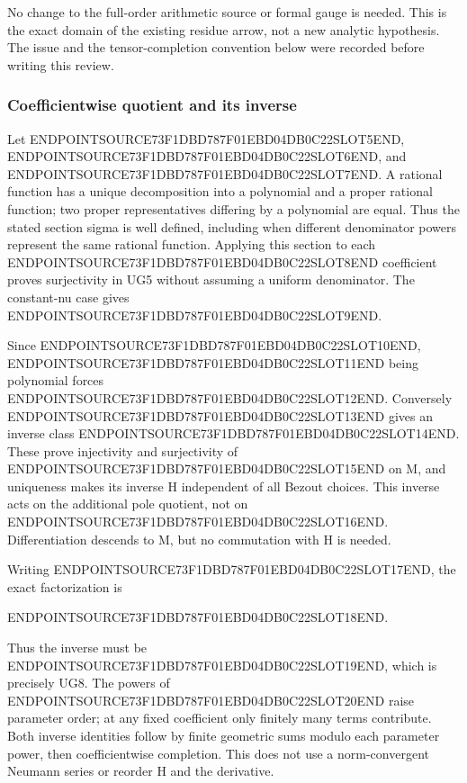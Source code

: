 No change to the full-order arithmetic source or formal gauge is needed. This is the exact domain of the existing residue arrow, not a new analytic hypothesis. The issue and the tensor-completion convention below were recorded before writing this review.

\subsubsection{Coefficientwise quotient and its inverse}\label{endpoint-f1_unit_gauge_review--coefficientwise-quotient-and-its-inverse}

Let ENDPOINTSOURCE73F1DBD787F01EBD04DB0C22SLOT5END, ENDPOINTSOURCE73F1DBD787F01EBD04DB0C22SLOT6END, and ENDPOINTSOURCE73F1DBD787F01EBD04DB0C22SLOT7END. A rational function has a unique decomposition into a polynomial and a proper rational function; two proper representatives differing by a polynomial are equal. Thus the stated section sigma is well defined, including when different denominator powers represent the same rational function. Applying this section to each ENDPOINTSOURCE73F1DBD787F01EBD04DB0C22SLOT8END coefficient proves surjectivity in UG5 without assuming a uniform denominator. The constant-nu case gives ENDPOINTSOURCE73F1DBD787F01EBD04DB0C22SLOT9END.

Since ENDPOINTSOURCE73F1DBD787F01EBD04DB0C22SLOT10END, ENDPOINTSOURCE73F1DBD787F01EBD04DB0C22SLOT11END being polynomial forces ENDPOINTSOURCE73F1DBD787F01EBD04DB0C22SLOT12END. Conversely ENDPOINTSOURCE73F1DBD787F01EBD04DB0C22SLOT13END gives an inverse class ENDPOINTSOURCE73F1DBD787F01EBD04DB0C22SLOT14END. These prove injectivity and surjectivity of ENDPOINTSOURCE73F1DBD787F01EBD04DB0C22SLOT15END on M, and uniqueness makes its inverse H independent of all Bezout choices. This inverse acts on the additional pole quotient, not on ENDPOINTSOURCE73F1DBD787F01EBD04DB0C22SLOT16END. Differentiation descends to M, but no commutation with H is needed.

Writing ENDPOINTSOURCE73F1DBD787F01EBD04DB0C22SLOT17END, the exact factorization is

ENDPOINTSOURCE73F1DBD787F01EBD04DB0C22SLOT18END.

Thus the inverse must be ENDPOINTSOURCE73F1DBD787F01EBD04DB0C22SLOT19END, which is precisely UG8. The powers of ENDPOINTSOURCE73F1DBD787F01EBD04DB0C22SLOT20END raise parameter order; at any fixed coefficient only finitely many terms contribute. Both inverse identities follow by finite geometric sums modulo each parameter power, then coefficientwise completion. This does not use a norm-convergent Neumann series or reorder H and the derivative.

